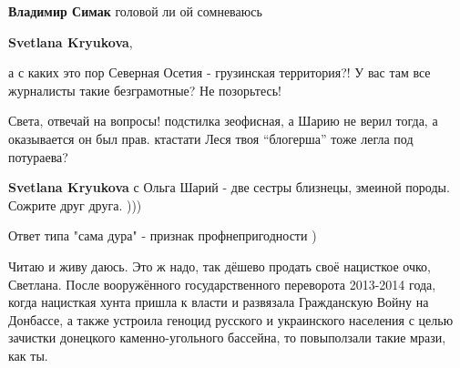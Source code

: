 \begin{itemize}
\begin{itemize}
\textbf{Владимир Симак} головой ли ой сомневаюсь

 
\textbf{Svetlana Kryukova}, 

а с каких это пор Северная Осетия - грузинская территория?! У вас там все
журналисты такие безграмотные? Не позорьтесь!


 
Света, отвечай на вопросы! подстилка зеофисная, а Шарию не верил тогда, а
оказывается он был прав. ктастати Леся твоя \enquote{блогерша} тоже легла под потураева?

 
\textbf{Svetlana Kryukova} с Ольга Шарий - две сестры близнецы, змеиной породы. Сожрите друг друга. )))

 
Ответ типа "сама дура" - признак профнепригодности )

 

Читаю и живу даюсь. Это ж надо, так дёшево продать своё нацисткое очко,
Светлана. После вооружённого государственного переворота 2013-2014 года, когда
нацисткая хунта пришла к власти и развязала Гражданскую Войну на Донбассе, а
также устроила геноцид русского и украинского населения с целью зачистки
донецкого каменно-угольного бассейна, то повыползали такие мрази, как ты.


 

\end{itemize}
\end{itemize}
